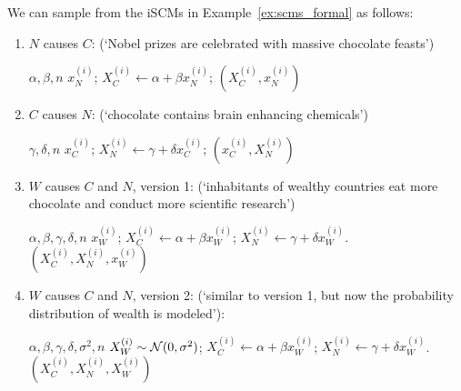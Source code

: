 \begin{Eg}\label{ex:scms_formal_sampling}
  We can sample from the iSCMs in Example~\ref{ex:scms_formal} as follows:
  \begin{enumerate}
    \item $N$ causes $C$: (`Nobel prizes are celebrated with massive chocolate feasts')\\
      \begin{algorithmic}[1]
        \Input $\alpha,\beta,n$
          \Input $x_N^{(i)}$;
          \State $X_C^{(i)} \leftarrow \alpha + \beta x_N^{(i)}$;
          \Output $(X_C^{(i)},x_N^{(i)})$
        \EndFor
      \end{algorithmic}
    \item $C$ causes $N$: (`chocolate contains brain enhancing chemicals')\\
      \begin{algorithmic}[1]
        \Input $\gamma,\delta,n$
          \Input $x_C^{(i)}$;
          \State $X_N^{(i)} \leftarrow \gamma + \delta x_C^{(i)}$;
          \Output $(x_C^{(i)},X_N^{(i)})$
        \EndFor
      \end{algorithmic}
    \item $W$ causes $C$ and $N$, version 1: (`inhabitants of wealthy countries eat more chocolate and conduct more scientific research')\\
      \begin{algorithmic}[1]
        \Input $\alpha,\beta,\gamma,\delta,n$
          \Input $x_W^{(i)}$;
          \State $X_C^{(i)} \leftarrow \alpha + \beta x_W^{(i)}$;
          \State $X_N^{(i)} \leftarrow \gamma + \delta x_W^{(i)}$.
          \Output $(X_C^{(i)},X_N^{(i)},x_W^{(i)})$
        \EndFor
      \end{algorithmic}
    \item $W$ causes $C$ and $N$, version 2: (`similar to version 1, but now the probability distribution of wealth is modeled'):\\
      \begin{algorithmic}[1]
        \Input $\alpha,\beta,\gamma,\delta,\sigma^2,n$
          \Sample $X_W^{(i)} \sim \mathcal{N}(0,\sigma^2)$;
          \State $X_C^{(i)} \leftarrow \alpha + \beta x_W^{(i)}$;
          \State $X_N^{(i)} \leftarrow \gamma + \delta x_W^{(i)}$.
          \Output $(X_C^{(i)},X_N^{(i)},X_W^{(i)})$
        \EndFor
      \end{algorithmic}
  \end{enumerate}
\end{Eg}

